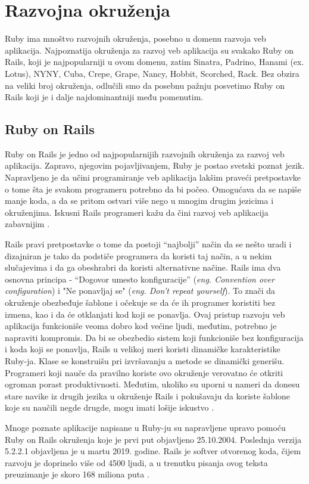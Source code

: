\documentclass[a4paper]{article}
\begin{document}
\section{Razvojna okruženja}
Ruby ima mnoštvo razvojnih okruženja, posebno u domenu razvoja veb aplikacija. Najpoznatija okruženja za razvoj veb aplikacija su svakako Ruby on Rails, koji je najpopularniji u ovom domenu, zatim Sinatra, Padrino, Hanami (ex. Lotus), NYNY, Cuba, Crepe, Grape, Nancy, Hobbit, Scorched, Rack. Bez obzira na veliki broj okruženja, odlučili smo da posebnu pažnju posvetimo Ruby on Rails koji je i dalje najdominantniji među pomenutim.
\subsection{Ruby on Rails}
Ruby on Rails je jedno od najpopularnijih razvojnih okruženja za razvoj veb aplikacija. Zapravo, njegovim pojavljivanjem, Ruby je postao svetski poznat jezik. Napravljeno je da učini programiranje veb aplikacija lakšim praveći pretpostavke o tome šta je svakom programeru potrebno da bi počeo. Omogućava da se napiše manje koda, a da se pritom ostvari više nego u mnogim drugim jezicima i okruženjima. Iskusni Rails programeri kažu da čini razvoj veb aplikacija zabavnijim \cite{rubyOnRails}.

Rails pravi pretpostavke o tome da postoji “najbolji” način da se nešto uradi i dizajniran je tako da podstiče programera da koristi taj način, a u nekim slučajevima i da ga obeshrabri da koristi alternativne načine.  Rails ima dva osnovna principa - “Dogovor umesto konfiguracije” (\emph{eng. Convention over configuration}) i "Ne ponavljaj se" (\emph{eng. Don't repeat yourself}). To znači da okruženje obezbeđuje šablone i očekuje se da će ih programer koristiti bez izmena, kao i da će otklanjati kod koji se ponavlja. Ovaj pristup razvoju veb aplikacija funkcioniše veoma dobro kod većine ljudi, međutim, potrebno je napraviti kompromis. Da bi se obezbedio sistem koji funkcioniše bez konfiguracija i koda koji se ponavlja, Rails u velikoj meri koristi dinamičke karakteristike Ruby-ja. Klase se konstruišu pri izvršavanju a metode se dinamički generišu. Programeri koji nauče da pravilno koriste ovo okruženje verovatno će otkriti ogroman porast produktivnosti. Međutim, ukoliko su uporni u nameri da donesu stare navike iz drugih jezika u okruženje Rails i pokušavaju da koriste šablone koje su naučili negde drugde, mogu imati lošije iskustvo \cite{rubyOnRails}\cite{specDynTech}.


Mnoge poznate aplikacije napisane u Ruby-ju su napravljene upravo pomoću Ruby on Rails okruženja koje je prvi put objavljeno 25.10.2004. Poslednja verzija 5.2.2.1 objavljena je u martu 2019. godine. Rails je softver otvorenog koda, čijem razvoju je doprinelo više od 4500 ljudi, a u trenutku pisanja ovog teksta preuzimanje je skoro 168 miliona puta \cite{rubyToolbox}.
\end{document}
